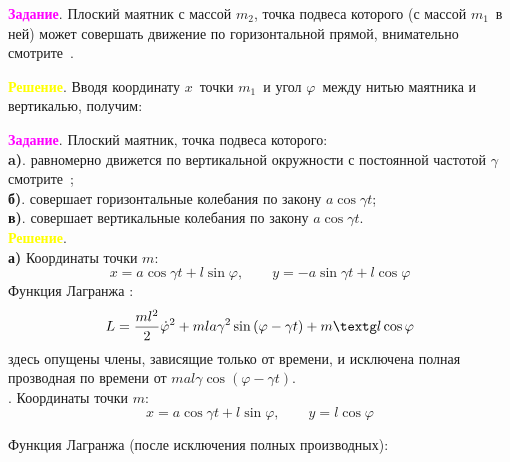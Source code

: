 {\noindent
\textcolor{magenta}{\textbf{Задание}}. Плоский маятник с массой $m_2$,
точка подвеса которого (с массой $m_1$\, в ней) может совершать движение
по горизонтальной прямой, внимательно смотрите~.


\noindent
\textcolor{yellow}{\textbf{Решение}}. Вводя координату $x$\, точки
$m_1$\, и угол $\varphi$\, между нитью маятника и вертикалью,
получим:

\begin{center}
\end{center}

\vglue 5pt

\noindent
\textcolor{magenta}{\textbf{Задание}}. Плоский маятник,
точка подвеса которого:\\
\noindent
\textbf{a)}. равномерно движется по вертикальной окружности с постоянной частотой
$\gamma$\\ смотрите~;\\
\noindent
\textbf{б)}. совершает горизонтальные колебания по закону $a \cos \gamma t$;\\
\noindent
\textbf{в)}. совершает вертикальные колебания по закону $a\cos \gamma t$.\\

\noindent
\textcolor{yellow}{\textbf{Решение}}.\\
\noindent
\textbf{а)} Координаты точки $m$:
$$
x = a \cos \gamma t + l \sin \varphi, \qquad
y = -a \sin \gamma t + l \cos \varphi
$$
Функция Лагранжа :
$$
L = \frac{ml^2}{2} \dot{\varphi}^2 + mla\gamma^2 \sin
\left(\varphi - \gamma t \right) + m\text{\textg}l\cos \varphi
$$
здесь опущены члены, зависящие только от времени, и исключена полная
прозводная по времени от $mal\gamma \cos\left(\varphi - \gamma t\right)$.\\

\noindent
{}. Координаты точки $m$:
$$
x = a \cos \gamma t + l \sin \varphi, \qquad y = l \cos\varphi
$$


Функция Лагранжа (после исключения полных производных):


}
